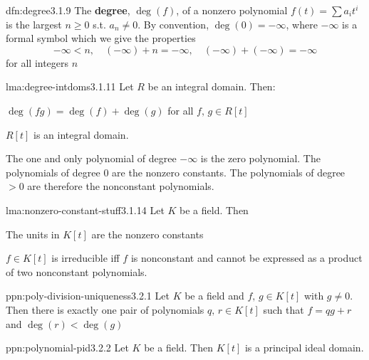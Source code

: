 \documentclass[landscape, 8pt]{extarticle}
\begin{document}
\begin{multicols}{3}

\begin{dfn}[Degree]{dfn:degree}{3.1.9}
    The \textbf{degree}, $\deg(f)$, of a nonzero polynomial $f(t) = \sum a_{i}t^{i}$ is the largest $n \ge 0$ s.t. $a_{n}\ne 0$. By convention, $\deg(0) = -\infty$, where $-\infty$ is a formal symbol which we give the properties
    \[-\infty < n, \quad (-\infty) + n = -\infty, \quad (-\infty) + (-\infty) = -\infty\]
    for all integers $n$
\end{dfn}

\begin{lma}{lma:degree-intdoms}{3.1.11}
    Let $R$ be an integral domain. Then:
    \begin{enumerate-tight}
        \item $\deg(fg) = \deg(f) + \deg(g)$ for all $f,\,g\in R[t]$
        \item $R[t]$ is an integral domain.
    \end{enumerate-tight}

    \longrule{0.08ex}
    The one and only polynomial of degree $-\infty$ is the zero polynomial. The polynomials of degree $0$ are the nonzero constants. The polynomials of degree $>0$ are therefore the nonconstant polynomials.
\end{lma}

\begin{lma}[]{lma:nonzero-constant-stuff}{3.1.14}
    Let $K$ be a field. Then
    \begin{enumerate-tight}
        \item The units in $K[t]$ are the nonzero constants
        \item $f\in K[t]$ is irreducible iff $f$ is nonconstant and cannot be expressed as a product of two nonconstant polynomials.
    \end{enumerate-tight}
\end{lma}

\begin{ppn}{ppn:poly-division-uniqueness}{3.2.1}
    Let $K$ be a field and $f,\,g\in K[t]$ with $g\ne 0$. Then there is exactly one pair of polynomials $q,\,r\in K[t]$ such that $f = qg + r$ and $\deg(r) < \deg(g)$
\end{ppn}

\begin{ppn}{ppn:polynomial-pid}{3.2.2}
    Let $K$ be a field. Then $K[t]$ is a principal ideal domain.
\end{ppn}


\end{multicols}
\end{document}
